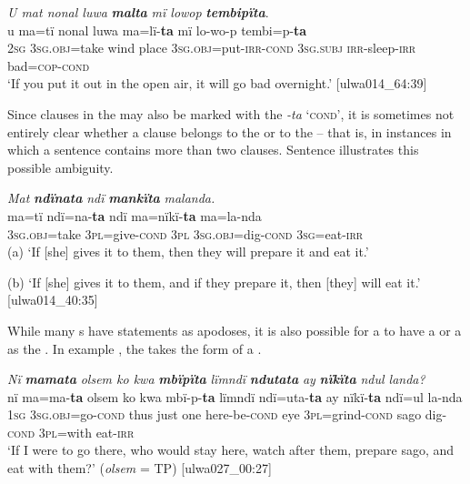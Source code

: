 \ea%
    \label{ex:syntax:257}
          \textit{U mat nonal luwa} \textbf{\textit{malta}} \textit{mï lowop} \textbf{\textit{tembipïta}}.\\
\gll u    ma=tï      nonal  luwa  ma=lï{}-\textbf{ta} mï      lo-wo-p    tembi=p-\textbf{ta}\\
    2\textsc{sg}  \textsc{3sg.obj}=take  wind  place  3\textsc{sg.obj}=put-\textsc{irr-cond}  3\textsc{sg.subj}  \textsc{irr}{}-sleep-\textsc{irr}  bad=\textsc{cop{}-cond}\\
\glt `If you put it out in the open air, it will go bad overnight.’ [ulwa014\_64:39]
\z



Since clauses in the  may also be marked with the   \textit{-ta} ‘\textsc{cond}’, it is sometimes not entirely clear whether a clause belongs to the  or to the  – that is, in instances in which a  sentence contains more than two clauses. Sentence  illustrates this possible ambiguity.

\ea\label{ex:syntax:258}  \textit{Mat} \textbf{\textit{ndïnata}} \textit{ndï} \textbf{\textit{mankïta}} \textit{malanda.}\\
\gll    ma=tï      ndï=na-\textbf{ta}      ndï  ma=nïkï-\textbf{ta} ma=la-nda\\
    3\textsc{sg.obj}=take  3\textsc{pl}=give-\textsc{cond}  3\textsc{pl}  \textsc{3sg.obj=}dig{}-\textsc{cond}    \textsc{3sg}=eat-\textsc{irr}\\
\glt    (a) ‘If [she] gives it to them, then they will prepare it and eat it.’

    (b) ‘If [she] gives it to them, and if they prepare it, then [they] will eat it.’ [ulwa014\_40:35]
\z

While many s have statements as  apodoses, it is also possible for a  to have a  or a  as the . In example , the  takes the form of a .

\newpage

\ea%
    \label{ex:syntax:259}
          \textit{Nï} \textbf{\textit{mamata}} \textit{olsem ko kwa} \textbf{\textit{mbïpïta}} \textit{lïmndï} \textbf{\textit{ndutata}} \textit{ay} \textbf{\textit{nïkïta}} \textit{ndul landa?}\\
\gll    nï    ma=ma-\textbf{ta}        olsem  ko  kwa  mbï-p-\textbf{ta} lïmndï  ndï=uta-\textbf{ta}      ay    nïkï-\textbf{ta}    ndï=ul    la-nda\\
    1\textsc{sg}  3\textsc{sg.obj}=go-\textsc{cond}    thus  just  one    here-be\textsc{{}-cond}    eye    3\textsc{pl}=grind\textsc{{}-cond} sago  dig{}-\textsc{cond}  3\textsc{pl}=with  eat-\textsc{irr}\\
\glt `If I were to go there, who would stay here, watch after them, prepare sago, and eat with them?’ (\textit{olsem} = TP) [ulwa027\_00:27]
\z


